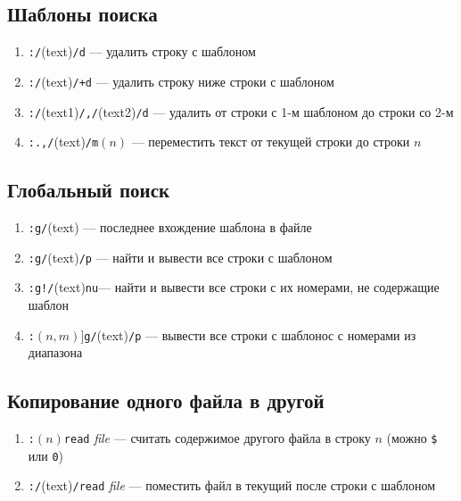 \documentclass[a4paper,10pt, twocolumn]{article}
\newcommand*{\cod}[1]{\texttt{#1}}
\begin{document}
\subsection{Шаблоны поиска}
\begin{enumerate}
    \item \cod{:/}(text)\cod{/d} --- удалить строку с шаблоном
    \item \cod{:/}(text)\cod{/+d} --- удалить строку ниже строки с шаблоном
    \item \cod{:/}(text1)\cod{/,/}(text2)\cod{/d} --- удалить от строки с 1-м шаблоном до строки со 2-м
    \item \cod{:.,/}(text)\cod{/m}$(n)$ --- переместить текст от текущей строки до строки $n$
\end{enumerate}

\subsection{Глобальный поиск}
\begin{enumerate}
    \item \cod{:g/}(text) --- последнее вхождение шаблона в файле
    \item \cod{:g/}(text)\cod{/p} --- найти и вывести все строки с шаблоном
    \item \cod{:g!/}(text)\cod{nu}--- найти и вывести все строки с их номерами, не содержащие шаблон
    \item \cod{:}$(n,m)$]\cod{g/}(text)\cod{/p} --- вывести все строки с шаблонос с номерами из диапазона
\end{enumerate}

\subsection{Копирование одного файла в другой}
\begin{enumerate}
    \item \cod{:}$(n)$\cod{read} \textit{file} --- считать содержимое другого файла в строку $n$ (можно \cod{\$} или \cod{0})
    \item \cod{:/}(text)\cod{/read} \textit{file} --- поместить файл в текущий после строки с шаблоном 
\end{enumerate}
\end{document}

